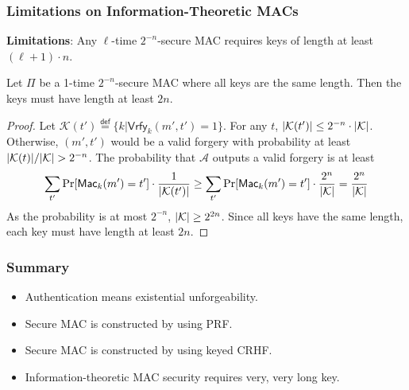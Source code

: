 \begin{frame}\frametitle{Limitations on Information-Theoretic MACs}
\textbf{Limitations}: Any $\ell$-time $2^{-n}$-secure MAC requires keys of length at least $(\ell +1) \cdot n$. 
\begin{theorem}
Let $\Pi$ be a 1-time $2^{-n}$-secure MAC where all keys are the same length. Then the keys must have length at least $2n$.
\end{theorem}
\begin{proof}
Let $\mathcal{K}(t') \overset{\mathsf{def}}{=} \{ k | \mathsf{Vrfy}_k(m', t') = 1\}$. For any $t$, $\lvert\mathcal{K}(t')\rvert \leq 2^{-n} \cdot \lvert\mathcal{K}\rvert$. Otherwise, $(m', t')$ would be a valid forgery with probability at least $\lvert\mathcal{K}(t)\rvert/\lvert\mathcal{K}\rvert> 2^{-n}$. The probability that $\mathcal{A}$ outputs a valid forgery is at least
\[ \sum_{t'} \Pr [\mathsf{Mac}_k(m') = t'] \cdot \frac{1}{\lvert\mathcal{K}(t')\rvert} \geq \sum_{t'} \Pr [\mathsf{Mac}_k(m') = t'] \cdot \frac{2^n}{\lvert\mathcal{K}\rvert} = \frac{2^n}{\lvert\mathcal{K}\rvert} 
\]
As the probability is at most $2^{-n}$, $\lvert\mathcal{K}\rvert \geq 2^{2n}$. Since all keys have the same length, each key must have length at least $2n$.
\end{proof} 
\end{frame}
\begin{frame}\frametitle{Summary}
\begin{itemize} 
\item Authentication means existential unforgeability.
\item Secure MAC is constructed by using PRF.
\item Secure MAC is constructed by using keyed CRHF.
\item Information-theoretic MAC security requires very, very long key.
\end{itemize}
\end{frame}

